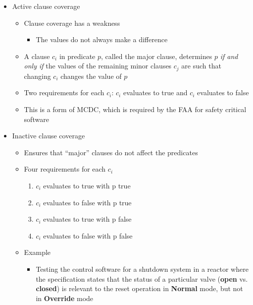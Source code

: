 \begin{itemize}
	\item Active clause coverage
	\begin{itemize}
		\item Clause coverage has a weakness
		\begin{itemize}
			\item The values do not always make a difference
		\end{itemize}
		\item A clause $ c_i$ in predicate $ p $, called the major clause, determines $ p $ \textit{if and only if} the values of the remaining minor clauses $ c_j $ are such that changing $ c_i $ changes the value of $ p $
		\item Two requirements for each $ c_i $: $ c_i $ evaluates to true and $ c_i $ evaluates to false
		\item This is a form of MCDC, which is required by the FAA for safety critical
		software

	\end{itemize}

	\item Inactive clause coverage
	\begin{itemize}
		\item Ensures that “major” clauses do not affect the predicates
		\item Four requirements for each $ c_i $
		\begin{enumerate}
			\item $c_i$ evaluates to true with p true
			\item $c_i$ evaluates to false with p true
			\item $c_i$ evaluates to true with p false
			\item $c_i$ evaluates to false with p false
		\end{enumerate}
		\item Example
		\begin{itemize}
			\item Testing the control software for a shutdown system in a reactor where the specification states that the status of a particular valve (\textbf{open} vs. \textbf{closed}) is relevant to the reset operation in \textbf{Normal} mode, but not in \textbf{Override} mode
		\end{itemize}
	\end{itemize}


\end{itemize}
